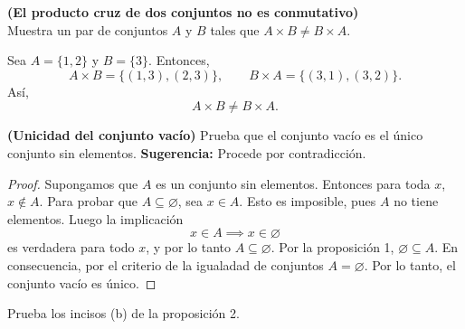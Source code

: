 \documentclass[12pt,a4paper]{article}
\begin{document}
    \begin{problema}
        \textbf{(El producto cruz de dos conjuntos no es conmutativo)}\\
        Muestra un par de conjuntos $A$ y $B$ tales que $A\times B\neq B\times A$.
    \end{problema}

    \begin{solucion}
        Sea $A=\{1,2\}$ y $B=\{3\}$. Entonces,
        \begin{equation*}
            A\times B=\{(1,3),(2,3)\},\qquad B\times A=\{(3,1),(3,2)\}.
        \end{equation*}
        Así,
        \begin{equation*}
            A\times B\neq B\times A.
        \end{equation*}
    \end{solucion}

    \begin{problema}
        \textbf{(Unicidad del conjunto vacío)}
        Prueba que el conjunto vacío es el único conjunto sin elementos. \textbf{Sugerencia:} Procede por contradicción.
    \end{problema}

    \begin{proof}
        Supongamos que $A$ es un conjunto sin elementos. Entonces para toda $x$, $x\notin A$.
        Para probar que $A\subseteq\varnothing$, sea $x\in A$. Esto es imposible, pues $A$ no tiene
        elementos. Luego la implicación
        \begin{equation*}
            x\in A\implies x\in\varnothing
        \end{equation*}
        es verdadera para todo $x$, y por lo tanto $A\subseteq\varnothing$. Por la proposición 1,
        $\varnothing\subseteq A$. En consecuencia, por el criterio de la igualadad de conjuntos $A=\varnothing$.
        Por lo tanto, el conjunto vacío es único.
    \end{proof}

    \begin{problema}
        Prueba los incisos (b) de la proposición 2.
    \end{problema}
\end{document}
